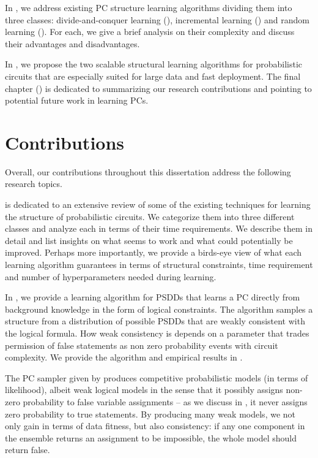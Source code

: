 In , we address existing PC structure learning algorithms dividing them into
three classes: divide-and-conquer learning (), incremental learning
() and random learning (). For each, we give a brief
analysis on their complexity and discuss their advantages and disadvantages.

In , we propose the two scalable structural learning algorithms for probabilistic
circuits that are especially suited for large data and fast deployment.  The final chapter
() is dedicated to summarizing our research contributions and pointing to
potential future work in learning PCs.

\section{Contributions}

Overall, our contributions throughout this dissertation address the following research topics.


 is dedicated to an extensive review of some of the existing techniques for
learning the structure of probabilistic circuits. We categorize them into three different classes
and analyze each in terms of their time requirements. We describe them in detail and list insights
on what seems to work and what could potentially be improved. Perhaps more importantly, we provide
a birds-eye view of what each learning algorithm guarantees in terms of structural constraints,
time requirement and number of hyperparameters needed during learning.


In \citet{geh21a}, we provide a learning algorithm for PSDDs that learns a PC directly from
background knowledge in the form of logical constraints. The algorithm samples a structure from a
distribution of possible PSDDs that are weakly consistent with the logical formula. How weak
consistency is depends on a parameter that trades permission of false statements as non zero
probability events with circuit complexity. We provide the algorithm and empirical results in
.


The PC sampler given by \citet{geh21a} produces competitive probabilistic models (in terms of
likelihood), albeit weak logical models in the sense that it possibly assigns non-zero probability
to false variable assignments -- as we discuss in , it never assigns zero
probability to true statements. By producing many weak models, we not only gain in terms of data
fitness, but also consistency: if any one component in the ensemble returns an assignment to be
impossible, the whole model should return false.

